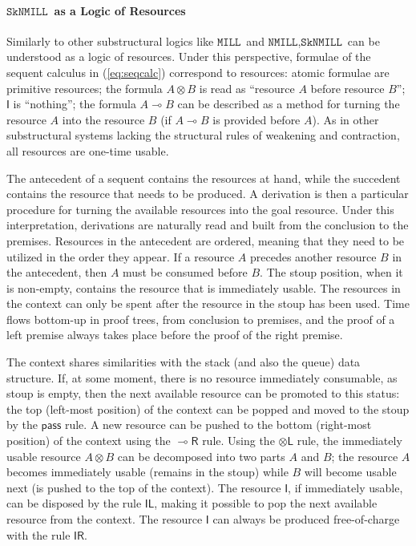 \documentclass[copyright,creativecommons]{eptcs}
\theoremstyle{definition}
\newcommand{\tl}{\otimes \mathsf{L}}
\newcommand{\lright}{{\multimap}\mathsf{R}}
\newcommand{\pass}{\mathsf{pass}}
\newcommand{\unitl}{\mathsf{IL}}
\newcommand{\unitr}{\mathsf{IR}}
\newcommand{\ot}{\otimes}
\newcommand{\lolli}{\multimap}
\newcommand{\I}{\mathsf{I}}
\newcommand{\MILL}{$\mathtt{MILL}$}
\newcommand{\NMILL}{$\mathtt{NMILL}$}
\newcommand{\SkNMILL}{$\mathtt{SkNMILL}$}
\begin{document}
\paragraph{\SkNMILL\ as a Logic of Resources}

Similarly to other substructural logics like \MILL\ and \NMILL,\linebreak \SkNMILL\ can be understood
as a logic of resources. Under this perspective, formulae of the
sequent calculus in (\ref{eq:seqcalc}) correspond to
resources: atomic formulae are primitive resources; the formula $A \ot
B$ is read as ``resource $A$ before resource $B$''; $\I$ is ``nothing''; the formula $A \lolli B$
can be described as a method for turning the resource $A$ into the
resource $B$ (if $A \lolli B$ is provided before $A$). As in other substructural systems lacking the structural
rules of weakening and contraction, all resources are one-time
usable.

The antecedent of a sequent contains the resources at hand, while the
succedent contains the resource that needs to be produced. A
derivation is then a particular procedure for turning the available
resources into the goal resource. Under this interpretation,
derivations are naturally read and built from the conclusion to the
premises. Resources in the antecedent are ordered, meaning that they
need to be utilized in the order they appear. If a resource $A$
precedes another resource $B$ in the antecedent, then
$A$ must be consumed before $B$. The stoup position, when it is
non-empty, contains the resource that is immediately usable. The
resources in the context can only be spent after the resource in the stoup has been used. Time flows
bottom-up in proof trees, from conclusion to premises, and the proof
of a left premise always takes place before the proof of the right
premise.

The context shares similarities with the stack (and also the queue) data
structure. If, at some moment, there is no resource immediately consumable, as stoup is empty, then the
next available resource can be promoted to this status: the top (left-most position) of the context
can be popped and moved to the
stoup by the $\pass$ rule. A new resource can be pushed to the bottom (right-most
position) of the context using the $\lright$ rule. Using the $\tl$
rule, the immediately usable resource $A \ot B$ can be decomposed into two parts $A$ and $B$; the resource $A$ becomes immediately usable (remains in the stoup) while $B$ will become usable next (is pushed to the top of the context).  The resource $\I$, if immediately usable, can be disposed by the rule $\unitl$, making it possible to pop the next available
resource from the context. The resource $\I$ can always be produced
free-of-charge with the rule $\unitr$.
\end{document}
